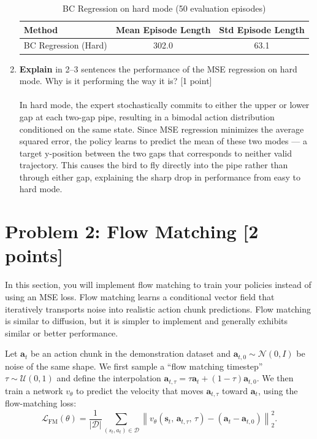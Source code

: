 \documentclass[12pt]{article}
\begin{document}
\begin{enumerate}
\begin{table}[h]
\centering
\begin{tabular}{lcc}
\hline
\textbf{Method} & \textbf{Mean Episode Length} & \textbf{Std Episode Length} \\
\hline
BC Regression (Hard) & 302.0 & 63.1 \\
\hline
\end{tabular}
\caption{BC Regression on hard mode (50 evaluation episodes)}
\end{table}


\item \textbf{Explain} in 2--3 sentences the performance of the MSE regression on hard mode. Why is it performing the way it is? [1 point]\\
\\

In hard mode, the expert stochastically commits to either the upper or lower gap at each two-gap pipe, resulting in a bimodal action distribution conditioned on the same state. Since MSE regression minimizes the average squared error, the policy learns to predict the mean of these two modes — a target y-position between the two gaps that corresponds to neither valid trajectory. This causes the bird to fly directly into the pipe rather than through either gap, explaining the sharp drop in performance from easy to hard mode.

\end{enumerate}


\newpage
\section*{Problem 2: Flow Matching [2 points]}

In this section, you will implement flow matching to train your policies instead of using an MSE loss.
Flow matching learns a conditional vector field that iteratively transports noise into realistic action chunk predictions.
Flow matching is similar to diffusion, but it is simpler to implement and generally exhibits similar or better performance.

Let $\mathbf{a}_t$ be an action chunk in the demonstration dataset and $\mathbf{a}_{t,0} \sim \mathcal{N}(0, I)$ be noise of the same shape.
We first sample a ``flow matching timestep'' $\tau \sim \mathcal{U}(0, 1)$ and define the interpolation
$\mathbf{a}_{t,\tau} = \tau\mathbf{a}_t + (1 - \tau)\mathbf{a}_{t,0}$.
We then train a network $v_\theta$ to predict the velocity that moves $\mathbf{a}_{t,\tau}$ toward $\mathbf{a}_t$, using the flow-matching loss:
\begin{equation}
    \mathcal{L}_{\mathrm{FM}}(\theta) = \frac{1}{|\mathcal{D}|}\sum_{(s_t, a_t) \in \mathcal{D}} \left\| v_\theta(\mathbf{s}_t,\, \mathbf{a}_{t,\tau},\, \tau) - \left(\mathbf{a}_t - \mathbf{a}_{t,0}\right) \right\|_2^2.
\end{equation}
\end{document}
